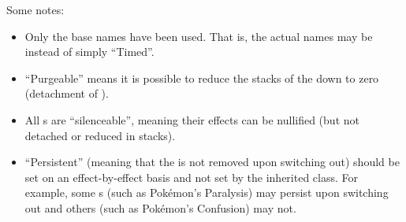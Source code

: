 \vspace*{1em}

Some notes:

\begin{itemize}
	\item{Only the base names have been used. That is, the actual names may be\\  instead of simply ``Timed''.}
	\item{``Purgeable'' means it is possible to reduce the stacks of the  down to zero (detachment of ).}
	\item{All s are ``silenceable'', meaning their effects can be nullified (but not detached or reduced in stacks).}
	\item{``Persistent'' (meaning that the  is not removed upon switching out) should be set on an effect-by-effect basis and not set by the inherited class. For example, some s (such as Pok\'{e}mon's Paralysis) may persist upon switching out and others (such as Pok\'{e}mon's Confusion) may not.}
\end{itemize}


\postamble{}